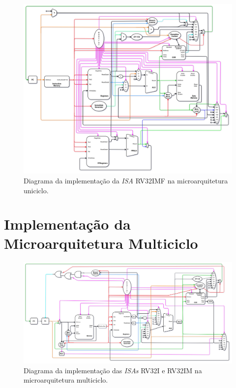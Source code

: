     \begin{figure}[H]
    \centering
        \includegraphics[width=1\linewidth]{../images/uarch_diagrams/singlecycle-RV32IMF.png}
        \caption{Diagrama da implementação da \textit{ISA} RV32IMF na
        microarquitetura uniciclo.}\label{fig:diagram_rv32imf_uni}
    \end{figure}

\section{Implementação da Microarquitetura Multiciclo}

    \begin{figure}[H]
    \centering
        \includegraphics[width=1\linewidth]{../images/uarch_diagrams/multicycle-RV32I-RV32IM.png}
        \caption{Diagrama da implementação das \textit{ISAs} RV32I e RV32IM na
        microarquitetura multiciclo.}\label{fig:diagram_rv32i_multi}
    \end{figure}

